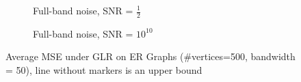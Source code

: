 \begin{figure}
\begin{subfigure}{0.3\columnwidth}
    \caption{Full-band noise, SNR = $\frac{1}{2}$}%
    \label{GLR_MSE_subfigb}%
    \end{subfigure}\hfill%
    \begin{subfigure}{0.3\columnwidth}
    \caption{Full-band noise, SNR = $10^{10}$}%
    \label{GLR_MSE_subfigc}%
    \end{subfigure}%
    \caption{Average MSE under GLR on ER Graphs (\#vertices=500, bandwidth = 50), line without markers is an upper bound}
\label{GLR_ER_MSE_fig}
\end{figure}


